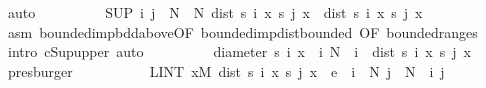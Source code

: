 \begin{isabellebody}
\ auto\isanewline
\ \ \ \ \ \ \isamarkupfalse%
\ \isamarkupfalse%
\ {\isachardoublequoteopen}{\isacharparenleft}{\kern0pt}SUP\ {\isacharparenleft}{\kern0pt}i{\isacharcomma}{\kern0pt}\ j{\isacharparenright}{\kern0pt}\ {\isasymin}\ {\isacharbraceleft}{\kern0pt}N{\isachardot}{\kern0pt}{\isachardot}{\kern0pt}{\isacharbraceright}{\kern0pt}\ {\isasymtimes}\ {\isacharbraceleft}{\kern0pt}N{\isachardot}{\kern0pt}{\isachardot}{\kern0pt}{\isacharbraceright}{\kern0pt}{\isachardot}{\kern0pt}\ dist\ {\isacharparenleft}{\kern0pt}s\ i\ x{\isacharparenright}{\kern0pt}\ {\isacharparenleft}{\kern0pt}s\ j\ x{\isacharparenright}{\kern0pt}{\isacharparenright}{\kern0pt}\ {\isasymge}\ dist\ {\isacharparenleft}{\kern0pt}s\ i\ x{\isacharparenright}{\kern0pt}\ {\isacharparenleft}{\kern0pt}s\ j\ x{\isacharparenright}{\kern0pt}{\isachardoublequoteclose}\ \isamarkupfalse%
\ asm\ bounded{\isacharunderscore}{\kern0pt}imp{\isacharunderscore}{\kern0pt}bdd{\isacharunderscore}{\kern0pt}above{\isacharbrackleft}{\kern0pt}OF\ bounded{\isacharunderscore}{\kern0pt}imp{\isacharunderscore}{\kern0pt}dist{\isacharunderscore}{\kern0pt}bounded{\isacharcomma}{\kern0pt}\ OF\ bounded{\isacharunderscore}{\kern0pt}range{\isacharunderscore}{\kern0pt}s{\isacharbrackright}{\kern0pt}\ \isamarkupfalse%
\ {\isacharparenleft}{\kern0pt}intro\ cSup{\isacharunderscore}{\kern0pt}upper{\isacharcomma}{\kern0pt}\ auto{\isacharparenright}{\kern0pt}\isanewline
\ \ \ \ \ \ \isamarkupfalse%
\ \isamarkupfalse%
\ {\isachardoublequoteopen}diameter\ {\isacharbraceleft}{\kern0pt}s\ i\ x\ {\isacharbar}{\kern0pt}\ i{\isachardot}{\kern0pt}\ N\ {\isasymle}\ i{\isacharbraceright}{\kern0pt}\ {\isasymge}\ dist\ {\isacharparenleft}{\kern0pt}s\ i\ x{\isacharparenright}{\kern0pt}\ {\isacharparenleft}{\kern0pt}s\ j\ x{\isacharparenright}{\kern0pt}{\isachardoublequoteclose}\ \isamarkupfalse%
\ presburger\isanewline
\ \ \ \ \isacommand{{\isacharbraceright}{\kern0pt}}\isamarkupfalse%
\isanewline
\ \ \ \ \isamarkupfalse%
\ {\isachardoublequoteopen}LINT\ x{\isacharbar}{\kern0pt}M{\isachardot}{\kern0pt}\ dist\ {\isacharparenleft}{\kern0pt}s\ i\ x{\isacharparenright}{\kern0pt}\ {\isacharparenleft}{\kern0pt}s\ j\ x{\isacharparenright}{\kern0pt}\ {\isacharless}{\kern0pt}\ e{\isachardoublequoteclose}\ \ {\isachardoublequoteopen}i\ {\isasymge}\ N{\isachardoublequoteclose}\ {\isachardoublequoteopen}j\ {\isasymge}\ N{\isachardoublequoteclose}\ \ i\ j\ \isamarkupfalse%

\end{isabellebody}
